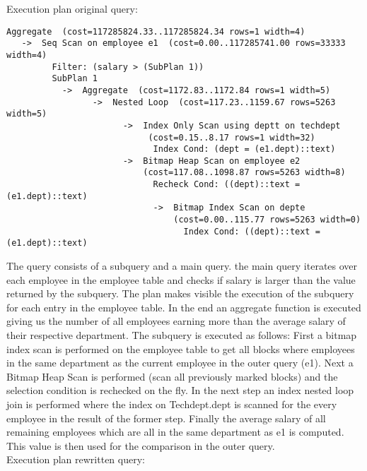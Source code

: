 \documentclass[11pt]{scrartcl}
\begin{document}
Execution plan original query:
\begin{noindent}
\begin{verbatim}
Aggregate  (cost=117285824.33..117285824.34 rows=1 width=4)
   ->  Seq Scan on employee e1  (cost=0.00..117285741.00 rows=33333 width=4)
         Filter: (salary > (SubPlan 1))
         SubPlan 1
           ->  Aggregate  (cost=1172.83..1172.84 rows=1 width=5)
                 ->  Nested Loop  (cost=117.23..1159.67 rows=5263 width=5)
                       ->  Index Only Scan using deptt on techdept
	                        (cost=0.15..8.17 rows=1 width=32)
                             Index Cond: (dept = (e1.dept)::text)
                       ->  Bitmap Heap Scan on employee e2
	                       (cost=117.08..1098.87 rows=5263 width=8)
                             Recheck Cond: ((dept)::text = (e1.dept)::text)
                             ->  Bitmap Index Scan on depte
	                             (cost=0.00..115.77 rows=5263 width=0)
                                   Index Cond: ((dept)::text = (e1.dept)::text)
\end{verbatim}
\end{noindent}
The query consists of a subquery and a main query. the main query iterates over each employee in the employee table and checks if salary is larger than the value returned by the subquery. The plan makes visible the execution of the subquery for each entry in the employee table. In the end an aggregate function is executed giving us the number of all employees earning more than the average salary of their respective department.
The subquery is executed as follows:
First a bitmap index scan is performed on the employee table to get all blocks where employees in the same department as the current employee in the outer query (e1). Next a Bitmap Heap Scan is performed (scan all previously marked blocks) and the selection condition is rechecked on the fly. In the next step an index nested loop join is performed where the index on Techdept.dept is scanned for the every employee in the result of the former step. Finally the average salary of all remaining employees which are all in the same department as e1 is computed. This value is then used for the comparison in the outer query.
\newpage
\ \\
Execution plan rewritten query:
\end{document}
